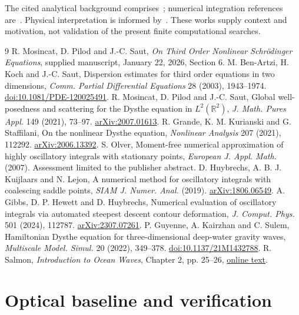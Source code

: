 \documentclass[10pt,letterpaper]{article}
\numberwithin{equation}{section}
\begin{document}
The cited analytical background comprises~\cite{BAKS,MPS2021,GKS}; numerical
integration references are~\cite{Olver,HKL,GHH}. Physical interpretation is
informed by~\cite{GKSfluid,Salmon}. These works supply context and motivation,
not validation of the present finite computational searches.
\clearpage\begin{thebibliography}{9}
 R. Mosincat, D. Pilod and J.-C. Saut,
\emph{On Third Order Nonlinear Schr\"odinger Equations}, supplied manuscript,
January 22, 2026, Section 6.
 M. Ben-Artzi, H. Koch and J.-C. Saut,
Dispersion estimates for third order equations in two dimensions,
\emph{Comm. Partial Differential Equations} 28 (2003), 1943--1974.
\href{https://doi.org/10.1081/PDE-120025491}{doi:10.1081/PDE-120025491}.
 R. Mosincat, D. Pilod and J.-C. Saut,
Global well-posedness and scattering for the Dysthe equation in $L^2(\mathbb R^2)$,
\emph{J. Math. Pures Appl.} 149 (2021), 73--97.
\href{https://arxiv.org/abs/2007.01613}{arXiv:2007.01613}.
 R. Grande, K. M. Kurianski and G. Staffilani,
On the nonlinear Dysthe equation, \emph{Nonlinear Analysis} 207 (2021), 112292.
\href{https://arxiv.org/abs/2006.13392}{arXiv:2006.13392}.
 S. Olver, Moment-free numerical approximation of highly oscillatory
integrals with stationary points, \emph{European J. Appl. Math.} (2007).
Assessment limited to the publisher abstract.
 D. Huybrechs, A. B. J. Kuijlaars and N. Lejon,
A numerical method for oscillatory integrals with coalescing saddle points,
\emph{SIAM J. Numer. Anal.} (2019).
\href{https://arxiv.org/abs/1806.06549}{arXiv:1806.06549}.
 A. Gibbs, D. P. Hewett and D. Huybrechs,
Numerical evaluation of oscillatory integrals via automated steepest descent
contour deformation, \emph{J. Comput. Phys.} 501 (2024), 112787.
\href{https://arxiv.org/abs/2307.07261}{arXiv:2307.07261}.
 P. Guyenne, A. Kairzhan and C. Sulem,
Hamiltonian Dysthe equation for three-dimensional deep-water gravity waves,
\emph{Multiscale Model. Simul.} 20 (2022), 349--378.
\href{https://doi.org/10.1137/21M1432788}{doi:10.1137/21M1432788}.
 R. Salmon, \emph{Introduction to Ocean Waves}, Chapter 2,
pp. 25--26, \href{https://www-pord.ucsd.edu/rsalmon/111.textbook.pdf}{online text}.
\end{thebibliography}
\clearpage\appendix

\section{Optical baseline and verification}
\end{document}
